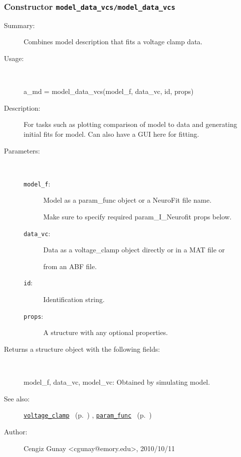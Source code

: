 \subsubsection[Constructor \texttt{model\_data\_vcs}]{Constructor \texttt{model\_data\_vcs/model\_data\_vcs}}%
%
\label{ref_model_data_vcs__model_data_vcs}%
\hypertarget{ref_model_data_vcs__model_data_vcs}{}%
\begin{description}
\item[Summary:]Combines model description that fits a voltage clamp data.
%
\item[Usage:]~%
\begin{lyxcode}%
a\_md = model\_data\_vcs(model\_f, data\_vc, id, props)
%
\end{lyxcode}%
%
\item[Description:]%
For tasks such as plotting comparison of model to data and generating
 initial fits for model. Can also have a GUI here for fitting.
\item[Parameters:]~
\begin{description}%
\item[\texttt{model\_f}:]
 Model as a param\_func object or a NeuroFit file name. 

Make sure to specify required param\_I\_Neurofit props below. 
\item[\texttt{data\_vc}:]
 Data as a voltage\_clamp object directly or in a MAT file or

from an ABF file.
\item[\texttt{id}:]
 Identification string.
\item[\texttt{props}:]
 A structure with any optional properties.
\end{description}%
%
\item[Returns a structure object with the following fields:
]~

   model\_f, data\_vc,
   model\_vc: Obtained by simulating model.
%
%
\item[See also:]%
\hyperlink{ref_voltage_clamp}{\texttt{voltage\_clamp}}%
\ (p.~\pageref{ref_voltage_clamp})%
%
, \hyperlink{ref_param_func}{\texttt{param\_func}}%
\ (p.~\pageref{ref_param_func})%
%
%
\item[Author:]%
Cengiz Gunay <cgunay@emory.edu>, 2010/10/11
%
\end{description}
\methodline%
